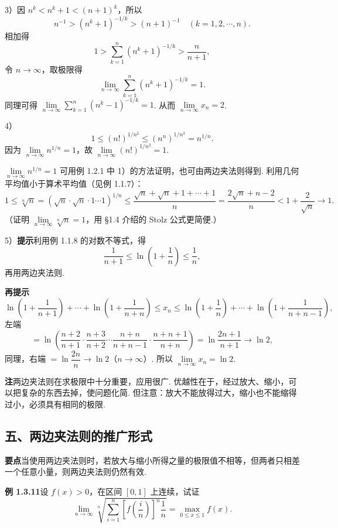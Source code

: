 \documentclass[UTF8, 12pt, fontset=fandol, oneside]{ctexart}
\begin{document}
3）因 $n^k<n^k+1<(n+1)^k$，所以
\[
  n^{-1}>(n^k+1)^{-1/k}>(n+1)^{-1}\quad(k=1,2,\cdots,n).
\]
相加得
\[
  1>\sum_{k=1}^n(n^k+1)^{-1/k}>\frac n{n+1},
\]
令 $n\to\infty$，取极限得
\[
  \lim_{n\to\infty}\sum_{k=1}^n(n^k+1)^{-1/k}=1.
\]
同理可得 $\lim\limits_{n\to\infty}\sum\limits_{k=1}^n(n^k-1)^{-1/k}=1$. 从而 $\lim\limits_{n\to\infty}x_n=2$.

4）
\[
  1\le(n!)^{1/n^2}\le(n^n)^{1/n^2}=n^{1/n}.
\]
因为 $\lim\limits_{n\to\infty}n^{1/n}=1$，故 $\lim\limits_{n\to\infty}(n!)^{1/n^2}=1$.

$\lim\limits_{n\to\infty}n^{1/n}=1$ 可用例 1.2.1 中 1）的方法证明，也可由两边夹法则得到. 利用几何平均值小于算术平均值（见例 1.1.7）：
\[
1\le\sqrt[n]{n}=(\sqrt n\cdot\sqrt n\cdot1\cdots1)^{1/n}
\le\frac{\sqrt n+\sqrt n+1+\cdots+1}{n}
=\frac{2\sqrt n+n-2}{n}<1+\frac2{\sqrt n}\to1.
\]
（证明 $\lim\limits_{n\to\infty}\sqrt[n]{n}=1$，用 §1.4 介绍的 Stolz 公式更简便.）

5）\textbf{提示}\quad 利用例 1.1.8 的对数不等式，得
\[
\frac1{n+1}\le\ln\left(1+\frac1n\right)\le\frac1n,
\]
再用两边夹法则.

\noindent\textbf{再提示}\quad
\[
\ln\left(1+\frac1{n+1}\right)+\cdots+\ln\left(1+\frac1{n+n}\right)
\le x_n
\le \ln\left(1+\frac1n\right)+\cdots+\ln\left(1+\frac1{n+n-1}\right),
\]
左端
\[
=\ln\left(\frac{n+2}{n+1}\cdot\frac{n+3}{n+2}\cdots
\frac{n+n}{n+n-1}\cdot\frac{n+n+1}{n+n}\right)
=\ln\frac{2n+1}{n+1}\to\ln2,
\]
同理，右端 $=\ln\dfrac{2n}{n}\to\ln2$（$n\to\infty$）. 所以 $\lim\limits_{n\to\infty}x_n=\ln2$.

\noindent\textbf{注}\quad 两边夹法则在求极限中十分重要，应用很广. 优越性在于，经过放大、缩小，可以把复杂的东西去掉，使问题化简. 但注意：放大不能放得过大，缩小也不能缩得过小，必须具有相同的极限.

\subsection*{五、两边夹法则的推广形式}

\noindent\textbf{要点}\quad 当使用两边夹法则时，若放大与缩小所得之量的极限值不相等，但两者只相差一个任意小量，则两边夹法则仍然有效.

\noindent\textbf{例 1.3.11}\quad 设 $f(x)>0$，在区间 $[0,1]$ 上连续，试证
\[
  \lim_{n\to\infty}\sqrt[n]{\sum_{i=1}^n\left[f\left(\frac in\right)\right]^n\frac1n}
  =\max_{0\le x\le1}f(x).
\]
\end{document}
